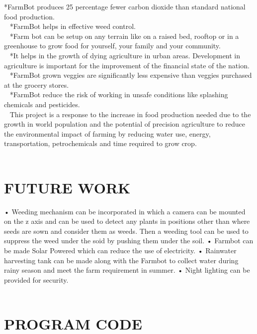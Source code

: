 \documentclass[12pt,a4paper]{report}
\begin{document}
\hspace*{1cm}*FarmBot produces 25 percentage fewer carbon dioxide than standard national food production.\\\
\hspace*{1cm}	*FarmBot helps in effective weed control. \\\
\hspace*{1cm}	*Farm bot can be setup on any terrain like on a raised bed, rooftop or in a greenhouse to grow food for yourself, your family and your community.\\\
\hspace*{1cm}	*It helps in the growth of dying agriculture in urban areas. Development in agriculture is important for the improvement of the financial state of the nation. \\\
\hspace*{1cm}  *FarmBot grown veggies are significantly less expensive than veggies purchased at the grocery stores. \\\
\hspace*{1cm}	*FarmBot reduce the risk of working in unsafe conditions like splashing chemicals and pesticides. \\\
\hspace*{1cm}
This project is a response to the increase in food production needed due to the growth in world population and the potential of precision agriculture to reduce the environmental impact of farming by reducing water use, energy, transportation, petrochemicals and time required to grow crop.\\\
\chapter{FUTURE WORK}
\hspace*{1cm}•	Weeding mechanism can be incorporated in which a camera can be mounted on the z axis and can be used to detect any plants in positions other than where seeds are sown and consider them as weeds. Then a weeding tool can be used to suppress the weed under the soid by pushing them under the soil.
•	Farmbot can be made Solar Powered which can reduce the use of electricity.
•	Rainwater harvesting tank can be made along with the Farmbot to collect water during rainy season and meet the farm requirement in summer.
•	Night lighting can be provided for security.\\\
\chapter{PROGRAM CODE}
\end{document}

